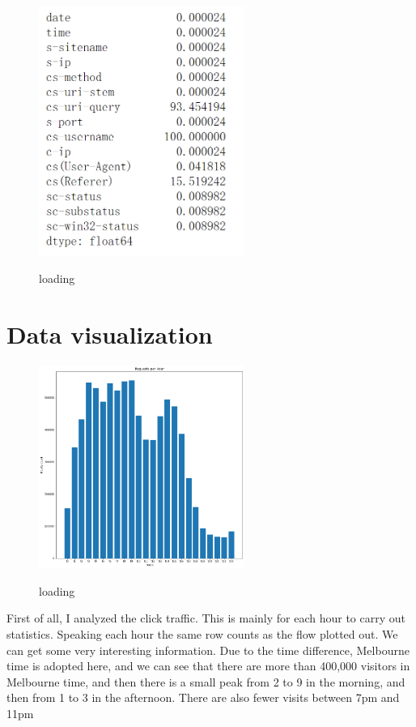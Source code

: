 	\begin{figure}
		\centering
		\includegraphics[width=0.6\textwidth]{Capture5.png}\\
		\caption{loading}\label{fig:loading}
	\end{figure}

\section{Data  visualization }\label{sec-intro}

\begin{figure}
	\centering
	\includegraphics[width=0.6\textwidth]{ll1.png}\\
	\caption{loading}\label{fig:loading}
\end{figure}
First of all, I analyzed the click traffic.
This is mainly for each hour to carry out statistics.
Speaking each hour the same row counts as the flow plotted out.
We can get some very interesting information. Due to the time difference, Melbourne time is adopted here, and we can see that there are more than 400,000 visitors in Melbourne time, and then there is a small peak from 2 to 9 in the morning, and then from 1 to 3 in the afternoon.
There are also fewer visits between 7pm and 11pm

